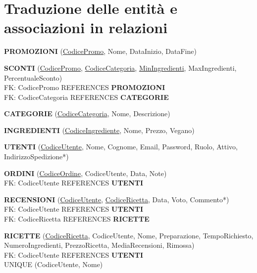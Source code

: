 \vspace{3em}

\section{Traduzione delle entità e associazioni in relazioni}
\vspace{1em}

\noindent\textbf{PROMOZIONI} (\underline{CodicePromo}, Nome, DataInizio, DataFine)

\vspace{1em}

\noindent\textbf{SCONTI} (\underline{CodicePromo}, \underline{CodiceCategoria}, \underline{MinIngredienti}, MaxIngredienti, PercentualeSconto) \\
FK: CodicePromo REFERENCES \textbf{PROMOZIONI} \\
FK: CodiceCategoria REFERENCES \textbf{CATEGORIE}

\vspace{1em}

\noindent\textbf{CATEGORIE} (\underline{CodiceCategoria}, Nome, Descrizione)

\vspace{1em}

\noindent\textbf{INGREDIENTI} (\underline{CodiceIngrediente}, Nome, Prezzo, Vegano)

\vspace{1em}

\noindent\textbf{UTENTI} (\underline{CodiceUtente}, Nome, Cognome, Email, Password, Ruolo, Attivo, IndirizzoSpedizione*)

\vspace{1em}

\noindent\textbf{ORDINI} (\underline{CodiceOrdine}, CodiceUtente, Data, Note) \\
FK: CodiceUtente REFERENCES \textbf{UTENTI}

\vspace{1em}

\noindent\textbf{RECENSIONI} (\underline{CodiceUtente}, \underline{CodiceRicetta}, Data, Voto, Commento*) \\
FK: CodiceUtente REFERENCES \textbf{UTENTI} \\
FK: CodiceRicetta REFERENCES \textbf{RICETTE}

\vspace{1em}

\noindent\textbf{RICETTE} (\underline{CodiceRicetta}, CodiceUtente, Nome, Preparazione, TempoRichiesto, NumeroIngredienti, PrezzoRicetta, MediaRecensioni, Rimossa) \\
FK: CodiceUtente REFERENCES \textbf{UTENTI} \\
UNIQUE (CodiceUtente, Nome)

